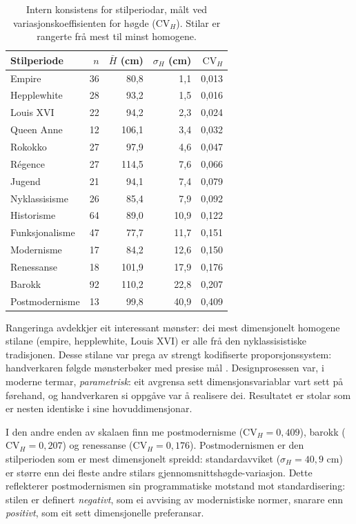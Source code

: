 \documentclass[10pt, a4paper, twocolumn]{article}
\begin{document}
\begin{table}[H]
\centering
\caption{Intern konsistens for stilperiodar, målt ved variasjonskoeffisienten for høgde ($\text{CV}_H$). Stilar er rangerte frå mest til minst homogene.}
\label{tab:cv_styles}
\begin{tabular}{@{}lrrrr@{}}
\toprule
\textbf{Stilperiode} & \textbf{$n$} & \textbf{$\bar{H}$ (cm)} & \textbf{$\sigma_H$ (cm)} & \textbf{$\text{CV}_H$} \\
\midrule
Empire & 36 & 80,8 & 1,1 & 0,013 \\
Hepplewhite & 28 & 93,2 & 1,5 & 0,016 \\
Louis XVI & 22 & 94,2 & 2,3 & 0,024 \\
Queen Anne & 12 & 106,1 & 3,4 & 0,032 \\
Rokokko & 27 & 97,9 & 4,6 & 0,047 \\
Régence & 27 & 114,5 & 7,6 & 0,066 \\
Jugend & 21 & 94,1 & 7,4 & 0,079 \\
Nyklassisisme & 26 & 85,4 & 7,9 & 0,092 \\
Historisme & 64 & 89,0 & 10,9 & 0,122 \\
Funksjonalisme & 47 & 77,7 & 11,7 & 0,151 \\
Modernisme & 17 & 84,2 & 12,6 & 0,150 \\
Renessanse & 18 & 101,9 & 17,9 & 0,176 \\
Barokk & 92 & 110,2 & 22,8 & 0,207 \\
Postmodernisme & 13 & 99,8 & 40,9 & 0,409 \\
\bottomrule
\end{tabular}
\end{table}

Rangeringa avdekkjer eit interessant mønster: dei mest dimensjonelt homogene stilane (empire, hepplewhite, Louis XVI) er alle frå den nyklassisistiske tradisjonen. Desse stilane var prega av strengt kodifiserte proporsjonssystem: handverkaren følgde mønsterbøker med presise mål \citep{hepplewhite1788, sheraton1803}. Designprosessen var, i moderne termar, \emph{parametrisk}: eit avgrensa sett dimensjonsvariablar vart sett på førehand, og handverkaren si oppgåve var å realisere dei. Resultatet er stolar som er nesten identiske i sine hovuddimensjonar.

I den andre enden av skalaen finn me postmodernisme ($\text{CV}_H = 0{,}409$), barokk ($\text{CV}_H = 0{,}207$) og renessanse ($\text{CV}_H = 0{,}176$). Postmodernismen er den stilperioden som er mest dimensjonelt spreidd: standardavviket ($\sigma_H = 40{,}9$ cm) er større enn dei fleste andre stilars gjennomsnittshøgde-variasjon. Dette reflekterer postmodernismen sin programmatiske motstand mot standardisering: stilen er definert \emph{negativt}, som ei avvising av modernistiske normer, snarare enn \emph{positivt}, som eit sett dimensjonelle preferansar.
\end{document}
